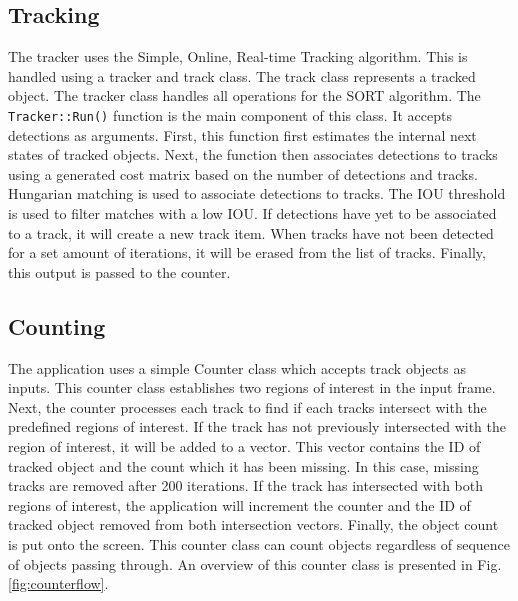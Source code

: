 \documentclass[12pt,a4paper,fleqn]{report}
\begin{document}
\subsection{Tracking}
The tracker uses the Simple, Online, Real-time Tracking algorithm.
This is handled using a tracker and track class.
The track class represents a tracked object.
The tracker class handles all operations for the SORT algorithm.
The \texttt{Tracker::Run()} function is the main component of this class.
It accepts detections as arguments.
First, this function first estimates the internal next states of tracked objects.
Next, the function then associates detections to tracks using a generated cost matrix based on the number
of detections and tracks.
Hungarian matching is used to associate detections to tracks.
The IOU threshold is used to filter matches with a low IOU.
If detections have yet to be associated to a track, it will create a new track item.
When tracks have not been detected for a set amount of iterations, it will be erased from the list
of tracks.
Finally, this output is passed to the counter.


\subsection{Counting}
The application uses a simple Counter class which accepts track objects as inputs.
This counter class establishes two regions of interest in the input frame.
Next, the counter processes each track to find if each tracks intersect with the predefined regions
of interest.
If the track has not previously intersected with the region of interest, it will be added to a vector.
This vector contains the ID of tracked object and the count which it has been missing.
In this case, missing tracks are removed after 200 iterations.
If the track has intersected with both regions of interest, the application will increment the
counter and the ID of tracked object removed from both intersection vectors.
Finally, the object count is put onto the screen.
This counter class can count objects regardless of sequence of objects passing through.
An overview of this counter class is presented in Fig. \ref{fig:counterflow}.
\end{document}
